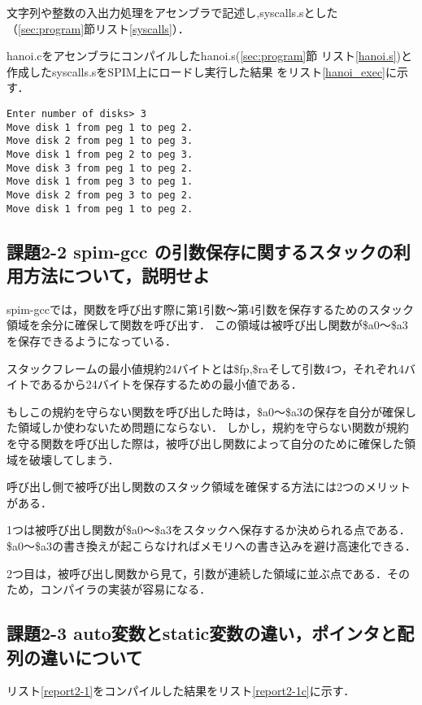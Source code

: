 \documentclass[11pt]{jarticle}
\begin{document}
文字列や整数の入出力処理をアセンブラで記述し,syscalls.sとした
（\ref{sec:program}節リスト\ref{syscalls}）．

hanoi.cをアセンブラにコンパイルしたhanoi.s(\ref{sec:program}節
リスト\ref{hanoi.s})と作成したsyscalls.sをSPIM上にロードし実行した結果
をリスト\ref{hanoi_exec}に示す．

\begin{lstlisting}[caption=実行結果,label=hanoi_exec]
Enter number of disks> 3
Move disk 1 from peg 1 to peg 2.
Move disk 2 from peg 1 to peg 3.
Move disk 1 from peg 2 to peg 3.
Move disk 3 from peg 1 to peg 2.
Move disk 1 from peg 3 to peg 1.
Move disk 2 from peg 3 to peg 2.
Move disk 1 from peg 1 to peg 2.
\end{lstlisting}

\subsection{課題2-2 spim-gcc の引数保存に関するスタックの利用方法について，説明せよ}

spim-gccでは，関数を呼び出す際に第1引数～第4引数を保存するためのスタック領域を余分に確保して関数を呼び出す．
この領域は被呼び出し関数が\$a0～\$a3を保存できるようになっている．

スタックフレームの最小値規約24バイトとは\$fp,\$raそして引数4つ，それぞれ4バイトであるから24バイトを保存するための最小値である．

もしこの規約を守らない関数を呼び出した時は，\$a0～\$a3の保存を自分が確保した領域しか使わないため問題にならない．
しかし，規約を守らない関数が規約を守る関数を呼び出した際は，被呼び出し関数によって自分のために確保した領域を破壊してしまう．

呼び出し側で被呼び出し関数のスタック領域を確保する方法には2つのメリットがある．

1つは被呼び出し関数が\$a0～\$a3をスタックへ保存するか決められる点である．
\$a0～\$a3の書き換えが起こらなければメモリへの書き込みを避け高速化できる．

2つ目は，被呼び出し関数から見て，引数が連続した領域に並ぶ点である．そのため，コンパイラの実装が容易になる．

\subsection{課題2-3 auto変数とstatic変数の違い，ポインタと配列の違いについて}

リスト\ref{report2-1}をコンパイルした結果をリスト\ref{report2-1c}に示す．
\end{document}
